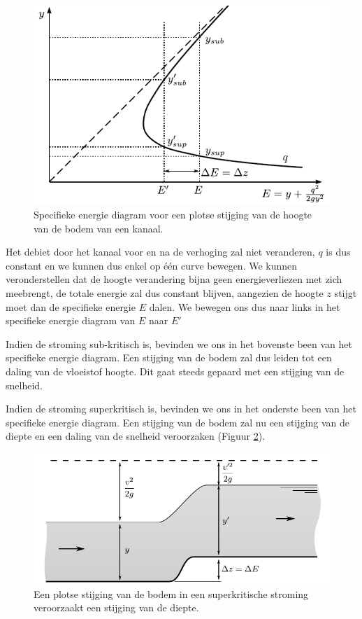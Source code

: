 \begin{figure}[htb]
	\centering
	\includegraphics{fig/kanaalstroming/Specifieke_energie_diagram_bodemstijging}
	\caption{Specifieke energie diagram voor een plotse stijging van de hoogte van de bodem van een kanaal.}
	\label{fig:Specifieke_energie_diagram_bodemstijging}
\end{figure}

Het debiet door het kanaal voor en na de verhoging zal niet veranderen, $q$ is dus constant en we kunnen dus enkel op één curve bewegen. We kunnen veronderstellen dat de hoogte verandering bijna geen energieverliezen met zich meebrengt, de totale energie zal dus constant blijven, aangezien de hoogte $z$ stijgt moet dan de specifieke energie $E$ dalen. We bewegen ons dus naar links in het specifieke energie diagram van $E$ naar $E'$

Indien de stroming sub-kritisch is, bevinden we ons in het bovenste been van het specifieke energie diagram. Een stijging van de bodem zal dus leiden tot een daling van de vloeistof hoogte. Dit gaat steeds gepaard met een stijging van de snelheid.

Indien de stroming superkritisch is, bevinden we ons in het onderste been van het specifieke energie diagram. Een stijging van de bodem zal nu een stijging van de diepte en een daling van de snelheid veroorzaken (Figuur \ref{fig:Open_kanaal_bodemstijging_superkritisch}). 
\begin{figure}[htb]
	\centering
	\includegraphics{fig/kanaalstroming/Open_kanaal_bodemstijging_superkritisch}
	\caption{Een plotse stijging van de bodem in een superkritische stroming veroorzaakt een stijging van de diepte.}
	\label{fig:Open_kanaal_bodemstijging_superkritisch}
\end{figure}

